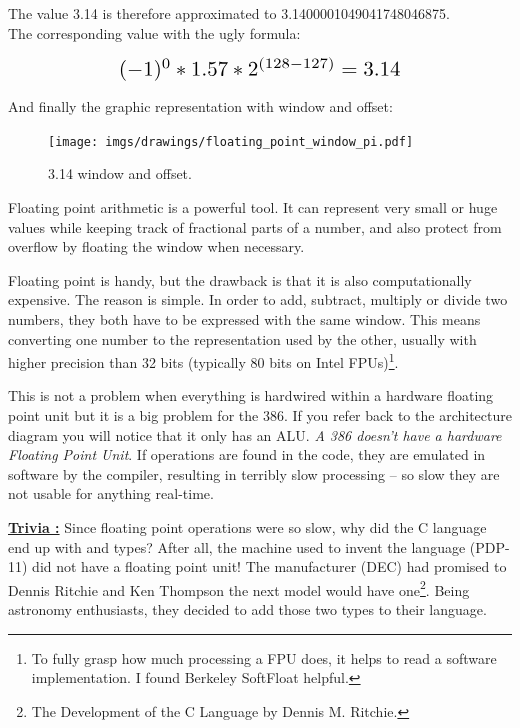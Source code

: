 \documentclass[book.tex]{subfiles}
\begin{document}
The value 3.14 is therefore approximated to 3.1400001049041748046875.\\

The corresponding value with the ugly formula:

\begin{equation*}
\scalebox{1.5}{
$(-1)^0 * 1.57 * 2^{(128-127)} = 3.14$
}
\end{equation*}

\par

And finally the graphic representation with window and offset:\\

\begin{figure}[H]
\centering
\texttt{[image: imgs/drawings/floating\_point\_window\_pi.pdf]}

\caption{3.14 window and offset.}
\label{fig:fp_internals}
\end{figure}
 

Floating point arithmetic is a powerful tool. It can represent very small or huge values while keeping track of fractional parts of a number, and also protect from overflow by floating the window when necessary.\\
\par
Floating point is handy, but the drawback is that it is also computationally expensive. The reason is simple. In order to add, subtract, multiply or divide two numbers, they both have to be expressed with the same window. This means converting one number to the representation used by the other, usually with higher precision than 32 bits (typically 80 bits on Intel FPUs)\footnote{To fully grasp how much processing a FPU does, it helps to read a software implementation. I found Berkeley SoftFloat helpful.}.\\
\par
This is not a problem when everything is hardwired within a hardware floating point unit but it is a big problem for the 386. If you refer back to the architecture diagram you will notice that it only has an ALU. \emph{A 386 doesn't have a hardware Floating Point Unit}. If  operations are found in the code, they are emulated in software by the compiler, resulting in terribly slow processing -- so slow they are not usable for anything real-time.\\ 
\par


 \textbf{\underline{Trivia :}} Since floating point operations were so slow, why did the C language end up with  and  types? After all, the machine used to invent the language (PDP-11) did not have a floating point unit! The manufacturer (DEC) had promised to Dennis Ritchie and Ken Thompson the next model would have one\footnote{The Development of the C Language by Dennis M. Ritchie.}. Being astronomy enthusiasts, they decided to add those two types to their language.\\
\par
\end{document}
